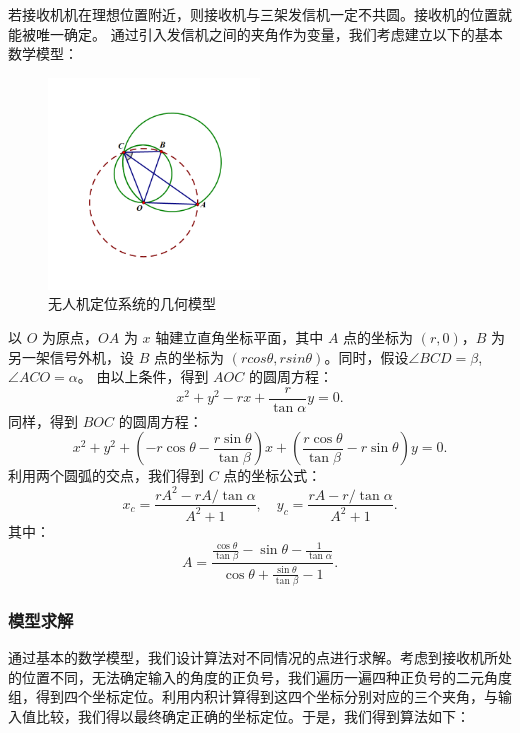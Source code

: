 \documentclass{my_paper}
\begin{document}
若接收机机在理想位置附近，则接收机与三架发信机一定不共圆。接收机的位置就能被唯一确定。
通过引入发信机之间的夹角作为变量，我们考虑建立以下的基本数学模型：

\begin{figure}[H]
    \centering
    \includegraphics[width=0.5\textwidth]{sketch2}
    \caption{无人机定位系统的几何模型} 
\end{figure}

以 $O$ 为原点，$OA$ 为 $x$ 轴建立直角坐标平面，其中 $A$ 点的坐标为 $(r,0)$，$B$ 为另一架信号外机，设 $B$ 点的坐标为 $(rcos\theta,rsin\theta)$。同时，假设$\angle B C D = \beta$, $ \angle A C O = \alpha$。
由以上条件，得到 $AOC$ 的圆周方程：
$$
x ^ { 2 } + y ^ { 2 } - r x + \frac { r } { \tan \alpha } y = 0.
$$
同样，得到 $BOC$ 的圆周方程：
$$
x ^ { 2 } + y ^ { 2 } + ( - r \cos \theta - \frac { r \sin \theta } { \tan \beta } ) x + ( \frac { r \cos \theta } { \tan \beta } - r \sin \theta ) y = 0.
$$
利用两个圆弧的交点，我们得到 $C$ 点的坐标公式：
$$
x _ { c } = \frac { r A ^ { 2 } - r A / \tan \alpha } { A ^ { 2 } + 1 }, 
\quad y _ { c } = \frac { r A - r / \tan \alpha } { A ^ { 2 } + 1 }.
$$
其中：
$$
A = \frac { \frac { \cos \theta } { \tan \beta } - \sin \theta - \frac { 1 } { \tan \alpha } } { \cos \theta + \frac { \sin \theta } { \tan \beta } - 1 }.
$$

\subsubsection{模型求解}

通过基本的数学模型，我们设计算法对不同情况的点进行求解。考虑到接收机所处的位置不同，无法确定输入的角度的正负号，我们遍历一遍四种正负号的二元角度组，得到四个坐标定位。利用内积计算得到这四个坐标分别对应的三个夹角，与输入值比较，我们得以最终确定正确的坐标定位。于是，我们得到算法如下：
\end{document}

